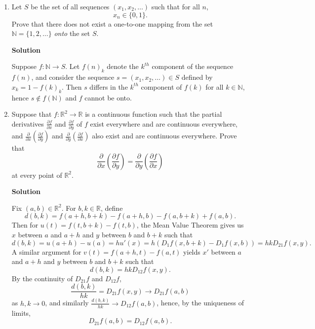 \documentclass{article}
\begin{document}
\begin{enumerate}
{\bf Solution}

Let \(\epsilon > 0\) and \(x_0 \in E\) be given.  Then there exists an \(N\) such that \(|f_n(x) - f(x)| < \epsilon\) for all \(n \geq N\) and \(x \in E\), and there exists a \(\delta > 0\) such that \(|f_N(x_0) - f_N(x)| < \epsilon\) whenever \(|x_0 - x| < \delta\).  It follows that
\[|f(x_0) - f(x)| < |f(x_0) - f_N(x_0)| + |f_N(x_0) - f_N(x)| + |f_N(x) - f(x)| < 3\epsilon\]
whenver \(|x_0 - x| < \delta\), proving that \(f\) is continuous at \(x_0\).  As \(x_0 \in E\) was arbitrary, \(f\) is continuous on \(E\).



\item Let \(S\) be the set of all sequences \((x_1, x_2, \ldots)\) such that for all \(n\),
\[x_n \in \{0,1\}.\]
Prove that there does not exist a one-to-one mapping from the set \(\mathbb{N} = \{1, 2, \ldots\}\) {\em onto} the set \(S\).

{\bf Solution}

Suppose \(f : \mathbb{N} \to S\).  Let \(f(n)_k\) denote the \(k^{th}\) component of the sequence \(f(n)\), and consider the sequence \(s = (x_1, x_2, \ldots) \in S\) defined by \(x_k = 1 - f(k)_k\).  Then \(s\) differs in the \(k^{th}\) component of \(f(k)\) for all \(k \in \mathbb{N}\), hence \(s \notin f(\mathbb{N})\) and \(f\) cannot be onto.



\item Suppose that \(f : \mathbb{R}^2 \to \mathbb{R}\) is a continuous function such that the partial derivatives \(\frac{\partial f}{\partial x}\) and \(\frac{\partial f}{\partial y}\) of \(f\) exist everywhere and are continuous everywhere, and \(\frac{\partial}{\partial x} \left( \frac{\partial f}{\partial y} \right)\) and \(\frac{\partial}{\partial y} \left( \frac{\partial f}{\partial x} \right)\) also exist and are continuous everywhere.  Prove that
\[  \frac{\partial}{\partial x} \left( \frac{\partial f}{\partial y} \right)
  = \frac{\partial}{\partial y} \left( \frac{\partial f}{\partial x} \right)\]
at every point of \(\mathbb{R}^2\).

{\bf Solution}

Fix \((a,b) \in \mathbb{R}^2\).  For \(b,k \in \mathbb{R}\), define
\[d(b,k) = f(a + h, b + k) - f(a + h, b) - f(a, b + k) + f(a, b).\]
Then for \(u(t) = f(t, b + k) - f(t, b)\), the Mean Value Theorem gives us \(x\) between \(a\) and \(a + h\) and \(y\) between \(b\) and \(b + k\) such that
\[d(b,k) = u(a + h) - u(a)
         = h u'(x)
         = h \left( D_1f(x, b + k) - D_1f(x, b) \right)
         = h k D_{21}f(x,y).\]
A similar argument for \(v(t) = f(a + h, t) - f(a, t)\) yields \(x'\) between \(a\) and \(a + h\) and \(y\) between \(b\) and \(b + k\) such that
\[d(b,k) = h k D_{12}f(x,y).\]
By the continuity of \(D_{21}f\) and \(D_{12}f\),
\[\frac{d(b,k)}{hk} = D_{21}f(x,y) \to D_{21}f(a,b)\]
as \(h,k \to 0\), and similarly \(\frac{d(b,k)}{hk} \to D_{12}f(a,b)\), hence, by the uniqueness of limits,
\[D_{21}f(a,b) = D_{12}f(a,b).\]




\end{enumerate}
\end{document}
